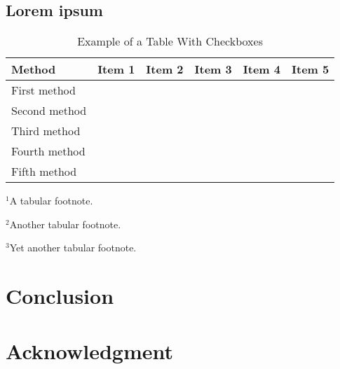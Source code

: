 \documentclass[conference]{IEEEtran}
\begin{document}
\subsection{Lorem ipsum}
\lipsum[18-20]

\begin{table}[!t]
\centering
\begin{threeparttable}
\renewcommand{\arraystretch}{1.25}
\setlength\tabcolsep{0.24em}
\caption{Example of a Table With Checkboxes}
\label{table_example}
\centering
\begin{tabular}{l|ccccc}
\vspace{-0.3em}
Method & Item 1 & Item 2 & Item 3 & Item 4 & Item 5 \tabularnewline
\hline
First method \cite{Hameed2018,Hameed2015} & \y[1] & \y & \y[2] & \n & \n \tabularnewline
Second method \cite{Muratore2019} & \n & \y & \y[2] & \y & \n \tabularnewline
Third method \cite{Kwon2018,Maas2003} & \y[3] & \n & \n & \y & \n \tabularnewline
Fourth method \cite{Andrews2012,Andrews2010a,Hammler2014} & \y[1] & \y & \y[2] & \y & \y \tabularnewline
Fifth method \cite{Klumperink2017} & \y & \y & \n & \y & \y \tabularnewline
\end{tabular}
\begin{tablenotes}
\scriptsize
  \item $^1$A tabular footnote.
  \item $^2$Another tabular footnote.
  \item $^3$Yet another tabular footnote.
\end{tablenotes}
\end{threeparttable}
\end{table}


\section{Conclusion}
\label{section_concl}
\lipsum[35]


\section*{Acknowledgment}
\lipsum[50][1-2]




\end{document}
